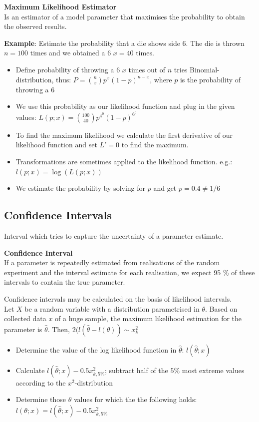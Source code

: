 \documentclass{article}
\begin{document}
\begin{multicols*}{3}
\begin{mdframed}[backgroundcolor=astral] 
    \textbf{Maximum Likelihood Estimator}\\
    Is an estimator of a model parameter that maximises the probability to obtain the observed results.
\end{mdframed}

\textbf{Example}: Estimate the probability that a die shows side 6. \textrightarrow The die is thrown $n = 100$ times and we obtained a 6 $x = 40$ times. 
\begin{itemize}
    \item Define probability of throwing a 6 $x$ times out of $n$ tries \textrightarrow Binomial-distribution, thus: $P = {n\choose x}p^x(1-p)^{n-x}$, where $p$ is the probability of throwing a 6
    \item We use this probability as our likelihood function and plug in the given values: $L(p;x) = {100\choose 40}p^4^0(1-p)^6^0$
    \item To find the maximum likelihood we calculate the first derivative of our likelihood function and set $L' = 0$ to find the maximum. 
    \item Transformations are sometimes applied to the likelihood function. e.g.: $l(p;x) = \log (L(p;x))$
    \item We estimate the probability by solving for $p$ and get $p = 0.4 \neq 1/6$
\end{itemize}

\subsection{Confidence Intervals}

Interval which tries to capture the uncertainty of a parameter estimate. 

\begin{mdframed}[backgroundcolor=astral] 
    \textbf{Confidence Interval}\\
    If a parameter is repeatedly estimated from realisations of the random experiment and the interval estimate for each realisation, we expect 95 \% of these intervals to contain the true parameter.
\end{mdframed}

Confidence intervals may be calculated on the basis of likelihood intervals.\\
Let $X$ be a random variable with a distribution parametrised in $\theta$. Based on collected data $x$ of a huge sample, the maximum likelihood estimation for the parameter is $\hat{\theta}$. Then, $2(l(\hat{\theta} - l(\theta)) \sim x^2_k$
\begin{itemize}
    \item Determine the value of the log likelihood function in $\hat{\theta}$: $l(\hat{\theta};x)$
    \item Calculate $l(\hat{\theta};x) - 0.5x^2_{k,5\%}$; subtract half of the $5\%$ most extreme values according to the $x^2$-distribution
    \item Determine those $\theta$ values for which the the following holds: 
    $l(\theta;x) = l(\hat{\theta};x) - 0.5x^2_{k,5\%}$
\end{itemize}


\end{multicols*}
\end{document}
